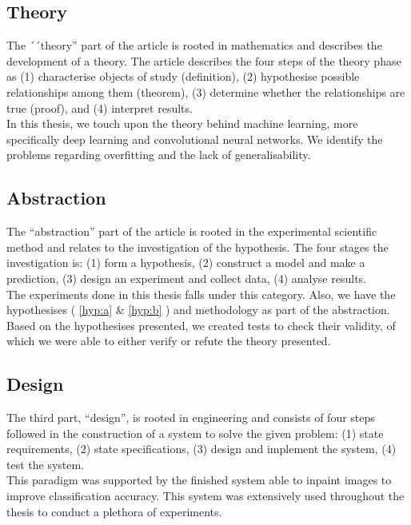 \subsection{Theory}
The ´´theory'' part of the article is rooted in mathematics and describes the development of a theory. The article describes the four steps of the theory phase as (1) characterise objects of study (definition), (2) hypothesise
possible relationships among them (theorem), (3) determine whether the
relationships are true (proof), and (4) interpret results.\\

In this thesis, we touch upon the theory behind machine learning, more specifically deep learning and convolutional neural networks. We identify the problems regarding overfitting and the lack of generalisability.



\subsection{Abstraction}
The ``abstraction'' part of the article is rooted in the experimental scientific method and relates to the investigation of the hypothesis. The four stages the investigation is: (1) form a hypothesis, (2) construct a model and make a prediction, (3) design an experiment and collect data, (4) analyse results. \\

The experiments done in this thesis falls under this category. Also, we have the hypothesises ( \ref{hyp:a} \& \ref{hyp:b} ) and methodology as part of the abstraction. Based on the hypothesises presented, we created tests to check their validity, of which we were able to either verify or refute the theory presented.



\subsection{Design}
The third part, ``design'', is rooted in engineering
and consists of four steps followed in the construction
of a system to solve the given problem: (1) state requirements, (2) state specifications, (3) design and implement the system, (4) test the system. \\

This paradigm was supported by the finished system able to inpaint images to improve classification accuracy. This system was extensively used throughout the thesis to conduct a plethora of experiments.



